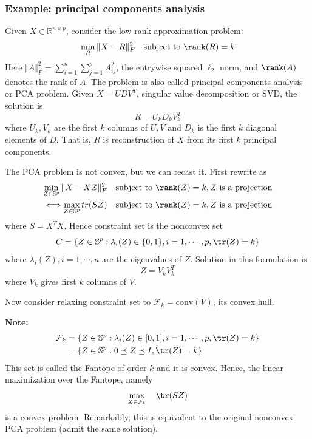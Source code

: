 \documentclass[a4paper]{article}
\begin{document}
{\subsubsection{Example: principal components analysis}
Given $X \in \mathbb{R}^{n \times p}$, consider the low rank approximation problem:
\begin{equation}
  \min_R \Vert X - R \Vert^2_F \quad \text{subject to} \ \rank(R) = k \nonumber
\end{equation} 
Here $\Vert A\Vert^2_F = \sum_{i=1}^n \sum_{j=1}^p A_{ij}^2$, the entrywise squared $\ell_2$ norm, and $\rank(A)$ denotes the rank of $A$. The problem is also called principal components analysis or PCA problem. Given $X = UDV^T$, singular value decomposition or SVD, the solution is
\begin{equation}
  R = U_k D_k V_k^T \nonumber
\end{equation}
where $U_k, V_k$ are the first $k$ columns of $U, V$ and $D_k$ is the first $k$ diagonal elements of $D$. That is, $R$ is reconstruction of $X$ from its first $k$ principal components.

The PCA problem is not convex, but we can recast it. First rewrite as
\begin{equation}
  \begin{aligned}
  \min_{Z \in \mathbb{S}^p} \Vert X - XZ \Vert^2_F \quad \text{subject to} \ \rank(Z) = k, Z \ \text{is a projection} \\
  \Longleftrightarrow \max_{Z \in \mathbb{S}^p} tr(SZ) \quad \text{subject to} \ \rank(Z) = k, Z \ \text{is a projection} \nonumber 
  \end{aligned}
\end{equation} 
where $S = X^T X$. Hence constraint set is the nonconvex set
\begin{equation}
  C = \{ Z \in   \mathbb{S}^p : \lambda_i(Z) \in \{0, 1\}, i = 1,\cdots, p, \tr(Z) = k \} \nonumber
\end{equation}
where $\lambda_i(Z), i = 1,\cdots, n$ are the eigenvalues of $Z$. Solution in this formulation is 
\begin{equation}
  Z = V_k V_k^T \nonumber
\end{equation}
where $V_k$ gives first $k$ columns of $V$.

\noindent Now consider relaxing constraint set to $\mathcal{F}_k = \text{conv}(V)$, its convex hull. 

\noindent \textbf{Note:} 
\begin{equation}
  \begin{aligned}
  \mathcal{F}_k & = \{ Z \in   \mathbb{S}^p : \lambda_i(Z) \in [0, 1], i = 1,\cdots, p, \tr(Z) = k \} \nonumber \\
   & = \{ Z \in   \mathbb{S}^p : 0 \preceq Z \preceq I, \tr(Z) = k \} 
  \end{aligned}
\end{equation}
This set is called the Fantope of order $k$ and it is convex. Hence, the linear maximization over the Fantope, namely
\begin{equation}
  \max_{Z \in  \mathcal{F}_k} \quad \tr(SZ) \nonumber
\end{equation}
is a convex problem. Remarkably, this is equivalent to the original nonconvex PCA problem (admit the same solution).

}
\end{document}
